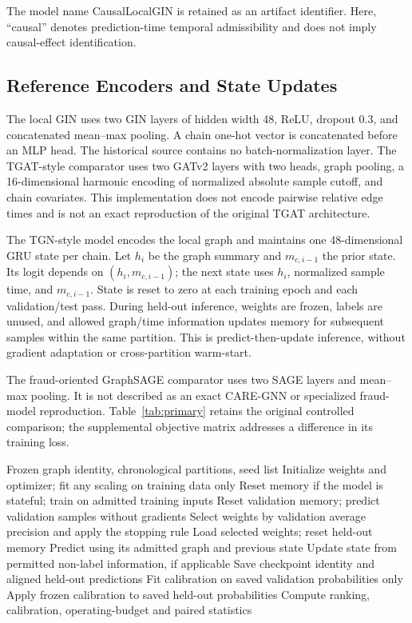 \documentclass[applsci,article,submit,pdftex,moreauthors]{Definitions/mdpi}
\begin{document}
The model name CausalLocalGIN is retained as an artifact identifier. Here, ``causal'' denotes prediction-time temporal admissibility and does not imply causal-effect identification.

\subsection{Reference Encoders and State Updates}
The local GIN uses two GIN layers of hidden width 48, ReLU, dropout 0.3, and concatenated mean--max pooling. A chain one-hot vector is concatenated before an MLP head. The historical source contains no batch-normalization layer. The TGAT-style comparator uses two GATv2 layers with two heads, graph pooling, a 16-dimensional harmonic encoding of normalized absolute sample cutoff, and chain covariates. This implementation does not encode pairwise relative edge times and is not an exact reproduction of the original TGAT architecture.

The TGN-style model encodes the local graph and maintains one 48-dimensional GRU state per chain. Let $h_i$ be the graph summary and $m_{c,i-1}$ the prior state. Its logit depends on $(h_i,m_{c,i-1})$; the next state uses $h_i$, normalized sample time, and $m_{c,i-1}$. State is reset to zero at each training epoch and each validation/test pass. During held-out inference, weights are frozen, labels are unused, and allowed graph/time information updates memory for subsequent samples within the same partition. This is predict-then-update inference, without gradient adaptation or cross-partition warm-start.

The fraud-oriented GraphSAGE comparator uses two SAGE layers and mean--max pooling. It is not described as an exact CARE-GNN or specialized fraud-model reproduction. Table~\ref{tab:primary} retains the original controlled comparison; the supplemental objective matrix addresses a difference in its training loss.

\begin{algorithm}[H]
\caption{Validation-selected graph evaluation with explicit state timing}
\begin{algorithmic}[1]
\Require Frozen graph identity, chronological partitions, seed list
\State Initialize weights and optimizer; fit any scaling on training data only
\State Reset memory if the model is stateful; train on admitted training inputs
\State Reset validation memory; predict validation samples without gradients
\State Select weights by validation average precision and apply the stopping rule
\EndFor
\State Load selected weights; reset held-out memory
\State Predict using its admitted graph and previous state
\State Update state from permitted non-label information, if applicable
\EndFor
\State Save checkpoint identity and aligned held-out predictions
\EndFor
\State Fit calibration on saved validation probabilities only
\State Apply frozen calibration to saved held-out probabilities
\State Compute ranking, calibration, operating-budget and paired statistics
\end{algorithmic}
\end{algorithm}
\end{document}
